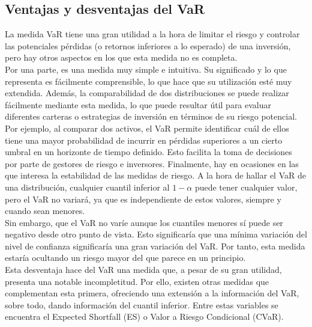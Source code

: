 \documentclass[11pt]{book}
\theoremstyle{plain} %
\theoremstyle{definition} %
\begin{document}
\subsection{Ventajas y desventajas del VaR}
La medida VaR tiene una gran utilidad a la hora de limitar el riesgo y 
controlar las potenciales pérdidas (o retornos inferiores a lo esperado) 
de una inversión, pero hay otros aspectos en los que esta medida no es 
completa.\\

Por una parte, es una medida muy simple e intuitiva. Su significado y lo que 
representa es fácilmente comprensible, lo que hace que su utilización esté 
muy extendida. Además, la comparabilidad de dos distribuciones se puede 
realizar fácilmente mediante esta medida, lo que puede resultar útil para 
evaluar diferentes carteras o estrategias de inversión en términos de su riesgo 
potencial. Por ejemplo, al comparar dos activos, el VaR permite identificar 
cuál de ellos tiene una mayor probabilidad de incurrir en pérdidas superiores 
a un cierto umbral en un horizonte de tiempo definido. Esto facilita la toma 
de decisiones por parte de gestores de riesgo e inversores. Finalmente, 
hay en ocasiones en las que interesa la estabilidad de las medidas de riesgo. 
A la hora de hallar el VaR de una distribución, cualquier cuantil inferior al 
$1-\alpha$ puede tener cualquier valor, pero el VaR no variará, ya que es 
independiente de estos valores, siempre y cuando sean menores.\\

Sin embargo, que el VaR no varíe aunque los cuantiles menores sí puede ser 
negativo desde otro punto de vista. Esto significaría que una mínima variación 
del nivel de confianza significaría una gran variación del VaR. Por tanto, esta 
medida estaría ocultando un riesgo mayor del que parece en un principio. \\

Esta desventaja hace del VaR una medida que, a pesar de su gran utilidad, 
presenta una notable incompletitud. Por ello, existen otras medidas que 
complementan esta primera, ofreciendo una extensión a la información del 
VaR, sobre todo, dando información del cuantil inferior. Entre estas 
variables se encuentra el Expected Shortfall (ES) o Valor a Riesgo
Condicional (CVaR). 
\end{document}
